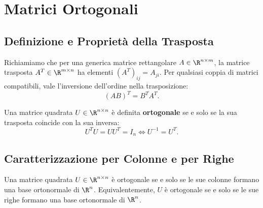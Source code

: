 \FloatBarrier
\section{Matrici Ortogonali}

\subsection{Definizione e Propriet\`a della Trasposta}

Richiamiamo che per una generica matrice rettangolare $A \in \R^{n \times m}$, la matrice trasposta $A^T \in \R^{m \times n}$ ha elementi $(A^T)_{ij} = A_{ji}$. Per qualsiasi coppia di matrici compatibili, vale l'inversione dell'ordine nella trasposizione:
\begin{equation}
    (AB)^T = B^T A^T.
\end{equation}

\begin{definition}
Una matrice quadrata $U \in \R^{n \times n}$ \`e definita \textbf{ortogonale} se e solo se la sua trasposta coincide con la sua inversa:
\begin{equation}
    U^T U = U U^T = I_n \iff U^{-1} = U^T.
\end{equation}
\end{definition}

\subsection{Caratterizzazione per Colonne e per Righe}

\begin{theorem}
Una matrice quadrata $U \in \R^{n \times n}$ \`e ortogonale se e solo se le sue colonne formano una base ortonormale di $\R^n$. Equivalentemente, $U$ \`e ortogonale se e solo se le sue righe formano una base ortonormale di $\R^n$.
\end{theorem}

